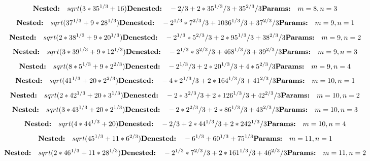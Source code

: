 \[
\textbf{Nested:}\quad sqrt(3*35^{1/3} + 16) \\
\textbf{Denested:}\quad -2/3 + 2*35^{1/3}/3 + 35^{2/3}/3 \\
\textbf{Params:}\quad m=8, n=3
\]
\[
\textbf{Nested:}\quad sqrt(37^{1/3} + 9*28^{1/3}) \\
\textbf{Denested:}\quad -2^{1/3}*7^{2/3}/3 + 1036^{1/3}/3 + 37^{2/3}/3 \\
\textbf{Params:}\quad m=9, n=1
\]
\[
\textbf{Nested:}\quad sqrt(2*38^{1/3} + 9*20^{1/3}) \\
\textbf{Denested:}\quad -2^{1/3}*5^{2/3}/3 + 2*95^{1/3}/3 + 38^{2/3}/3 \\
\textbf{Params:}\quad m=9, n=2
\]
\[
\textbf{Nested:}\quad sqrt(3*39^{1/3} + 9*12^{1/3}) \\
\textbf{Denested:}\quad -2^{1/3}*3^{2/3}/3 + 468^{1/3}/3 + 39^{2/3}/3 \\
\textbf{Params:}\quad m=9, n=3
\]
\[
\textbf{Nested:}\quad sqrt(8*5^{1/3} + 9*2^{2/3}) \\
\textbf{Denested:}\quad -2^{1/3}/3 + 2*20^{1/3}/3 + 4*5^{2/3}/3 \\
\textbf{Params:}\quad m=9, n=4
\]
\[
\textbf{Nested:}\quad sqrt(41^{1/3} + 20*2^{2/3}) \\
\textbf{Denested:}\quad -4*2^{1/3}/3 + 2*164^{1/3}/3 + 41^{2/3}/3 \\
\textbf{Params:}\quad m=10, n=1
\]
\[
\textbf{Nested:}\quad sqrt(2*42^{1/3} + 20*3^{1/3}) \\
\textbf{Denested:}\quad -2*3^{2/3}/3 + 2*126^{1/3}/3 + 42^{2/3}/3 \\
\textbf{Params:}\quad m=10, n=2
\]
\[
\textbf{Nested:}\quad sqrt(3*43^{1/3} + 20*2^{1/3}) \\
\textbf{Denested:}\quad -2*2^{2/3}/3 + 2*86^{1/3}/3 + 43^{2/3}/3 \\
\textbf{Params:}\quad m=10, n=3
\]
\[
\textbf{Nested:}\quad sqrt(4*44^{1/3} + 20) \\
\textbf{Denested:}\quad -2/3 + 2*44^{1/3}/3 + 2*242^{1/3}/3 \\
\textbf{Params:}\quad m=10, n=4
\]
\[
\textbf{Nested:}\quad sqrt(45^{1/3} + 11*6^{2/3}) \\
\textbf{Denested:}\quad -6^{1/3} + 60^{1/3} + 75^{1/3} \\
\textbf{Params:}\quad m=11, n=1
\]
\[
\textbf{Nested:}\quad sqrt(2*46^{1/3} + 11*28^{1/3}) \\
\textbf{Denested:}\quad -2^{1/3}*7^{2/3}/3 + 2*161^{1/3}/3 + 46^{2/3}/3 \\
\textbf{Params:}\quad m=11, n=2
\]
